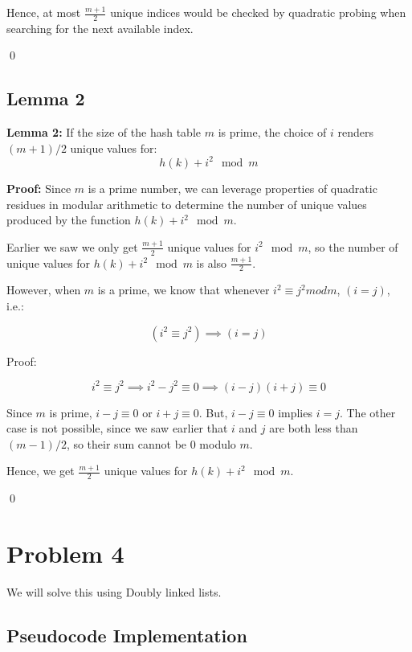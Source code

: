 \documentclass{cs1204}
\begin{document}
Hence, at most \( \frac{m + 1}{2} \) unique indices would be checked by quadratic probing when searching for the next available index.

\qed

\subsection*{Lemma 2}

\textbf{Lemma 2:} If the size of the hash table $m$ is prime, the choice of $i$ renders $(m + 1)/2$ unique values for:
\[ h(k) + i^2 \mod m \]

\textbf{Proof:}
Since \( m \) is a prime number, we can leverage properties of quadratic residues in modular arithmetic to determine the number of unique values produced by the function \( h(k) + i^2 \mod m \).

Earlier we saw we only get \(\frac{m + 1}{2}\) unique values for \(i^2 \mod m\), so the number of unique values for \(h(k) + i^2 \mod m\) is also \(\frac{m + 1}{2}\).

However, when $m$ is a prime, we know that whenever $i^2 \equiv j^2 mod m$, $(i = j)$, i.e.:

\[ (i^2 \equiv j^2) \implies (i = j) \]

Proof:

\[ i^2 \equiv j^2 \implies i^2 - j^2 \equiv 0 \implies (i - j)(i + j) \equiv 0 \]

Since $m$ is prime, $i - j \equiv 0$ or $i + j \equiv 0$. But, $i - j \equiv 0$ implies $i = j$. The other case is not possible, since we saw earlier that $i$ and $j$ are both less than $(m - 1)/2$, so their sum cannot be $0$ modulo $m$.

Hence, we get \(\frac{m + 1}{2}\) unique values for \(h(k) + i^2 \mod m\).

\qed


\newpage

\section*{Problem 4}

We will solve this using Doubly linked lists.

\subsection*{Pseudocode Implementation}
\end{document}

